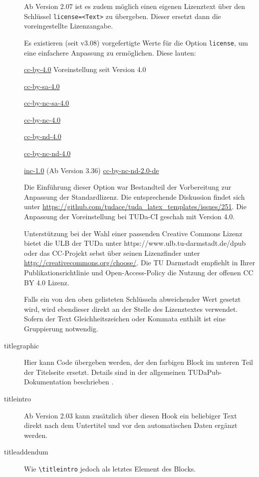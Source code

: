 \documentclass[
	german,%
	ruledheaders=section,%
	class=report,%
	thesis={type=bachelor},%
	fontsize=11pt,%
	parskip=half-,%
	custommargins=true,%
	marginpar=false,%
	accentcolor=9c,%
]{tudapub}
\let\code\texttt
\let\tbs\textbackslash
\begin{document}
\begin{description}
	      Ab Version 2.07 ist es zudem möglich einen eigenen Lizenztext über den Schlüssel \verb|license=<Text>| zu übergeben.
	      Dieser ersetzt dann die voreingestellte Lizenzangabe.

	      Es existieren (seit v3.08) vorgefertigte Werte für die Option \verb|license|, um eine einfachere Anpassung zu ermöglichen.
	      Diese lauten:

	      \parbox[t]{.5\linewidth}{%
		      \ttfamily
		      \href{https://creativecommons.org/licenses/by/4.0/}{cc-by-4.0} \textnormal{Voreinstellung seit Version 4.0}\par
		      \href{https://creativecommons.org/licenses/by-sa/4.0/}{cc-by-sa-4.0}\par
		      \href{https://creativecommons.org/licenses/by-nc-sa/4.0/}{cc-by-nc-sa-4.0}\par
		      \href{https://creativecommons.org/licenses/by-nc-/4.0/}{cc-by-nc-4.0}\par
	      }%
	      \parbox[t]{.5\linewidth}{
		      \ttfamily
		      \href{https://creativecommons.org/licenses/by-nd/4.0/}{cc-by-nd-4.0}\par
		      \href{https://creativecommons.org/licenses/by-nc-nd/4.0/}{cc-by-nc-nd-4.0}\par
		      \href{https://rightsstatements.org/page/InC/1.0/}{inc-1.0}\textnormal{ (Ab Version 3.36)}
		      \href{https://creativecommons.org/licenses/by-nc-nd/2.0/}{cc-by-nc-nd-2.0-de}\par
	      }

		Die Einführung dieser Option war Bestandteil der Vorbereitung zur Anpassung der Standardlizenz.
		Die entsprechende Diskussion findet sich unter \url{https://github.com/tudace/tuda_latex_templates/issues/251}.
		Die Anpassung der Voreinstellung bei TUDa-CI geschah mit Version 4.0.

	      Unterstützung bei der Wahl einer passenden Creative Commons Lizenz bietet die ULB der TUDa unter https://www.ulb.tu-darmstadt.de/dpub oder das CC-Projekt sebst über seinen Lizenzfinder unter \url{http://creativecommons.org/choose/}.
	      Die TU Darmstadt empfiehlt in Ihrer Publikationsrichtlinie und Open-Access-Policy die Nutzung der offenen CC BY 4.0 Lizenz.

	      Falls ein von den oben gelisteten Schlüsseln abweichender Wert gesetzt wird, wird ebendieser direkt an der Stelle des Lizenztextes verwendet.
	      Sofern der Text Gleichheitszeichen oder Kommata enthält ist eine Gruppierung notwendig.
	\item[titlegraphic] Hier kann Code übergeben werden, der den farbigen Block im unteren Teil der Titelseite ersetzt.
	      Details sind in der allgemeinen TUDaPub-Dokumentation beschrieben \cite{tudapub}.
	\item[titleintro] Ab Version 2.03 kann zusätzlich über diesen Hook ein beliebiger Text direkt nach dem Untertitel und vor den automatischen Daten ergänzt werden.
	\item[titleaddendum] Wie \code{\tbs{}titleintro} jedoch als letztes Element des Blocks.
\end{description}
\end{document}
